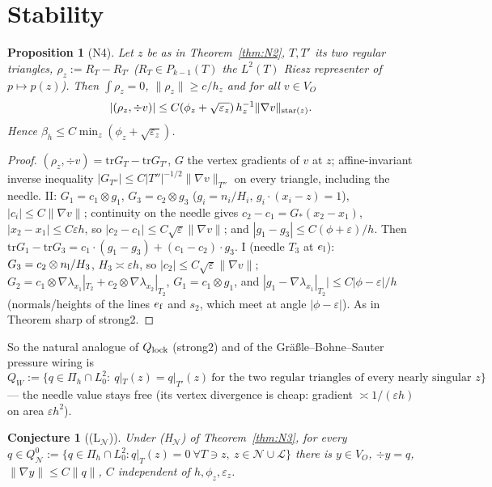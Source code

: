 \documentclass[11pt]{article}
\newtheorem{proposition}[theorem]{Proposition}
\newtheorem{conjecture}[theorem]{Conjecture}
\theoremstyle{remark}
\newcommand{\VO}{V_O}
\newcommand{\Pih}{\Pi_h}
\newcommand{\norm}[1]{\|#1\|}
\newcommand{\Nset}{\mathcal N}
\newcommand{\Lk}{\mathcal L}
\begin{document}
\section{Stability}\label{sec:stab}
\begin{proposition}[N4]\label{prop:beta}
Let $z$ be as in Theorem~\ref{thm:N2}, $T,T'$ its two regular triangles, $\rho_z:=R_T-R_{T'}$ ($R_T\in P_{k-1}(T)$ the $L^2(T)$ Riesz
representer of $p\mapsto p(z)$). Then $\int\rho_z=0$, $\norm{\rho_z}\ge c/h_z$ and for all $v\in\VO$
\[|(\rho_z,\div v)|\le C(\phi_z+\sqrt{\varepsilon_z})\,h_z^{-1}\norm{\nabla v}_{{\rm star}(z)} .\]
Hence $\beta_h\le C\min_z(\phi_z+\sqrt{\varepsilon_z})$.
\end{proposition}
\begin{proof}
$(\rho_z,\div v)=\mathrm{tr}G_T-\mathrm{tr}G_{T'}$, $G$ the vertex gradients of $v$ at $z$; affine-invariant inverse inequality
$|G_{T''}|\le C|T''|^{-1/2}\norm{\nabla v}_{T''}$ on every triangle, including the needle.
II: $G_1=c_1\otimes g_1$, $G_3=c_2\otimes g_3$ ($g_i=n_i/H_i$, $g_i\cdot(x_i-z)=1$), $|c_i|\le C\norm{\nabla v}$; continuity on the needle gives
$c_2-c_1=G_*(x_2-x_1)$, $|x_2-x_1|\le C\varepsilon h$, so $|c_2-c_1|\le C\sqrt\varepsilon\norm{\nabla v}$; and $|g_1-g_3|\le C(\phi+\varepsilon)/h$.
Then $\mathrm{tr}G_1-\mathrm{tr}G_3=c_1\cdot(g_1-g_3)+(c_1-c_2)\cdot g_3$.
I (needle $T_3$ at $e_{\rm l}$): $G_3=c_2\otimes n_{\rm l}/H_3$, $H_3\asymp\varepsilon h$, so $|c_2|\le C\sqrt\varepsilon\norm{\nabla v}$;
$G_2=c_1\otimes\nabla\lambda_{x_1}|_{T_2}+c_2\otimes\nabla\lambda_{x_2}|_{T_2}$, $G_1=c_1\otimes g_1$, and $|g_1-\nabla\lambda_{x_1}|_{T_2}|\le C|\phi-\varepsilon|/h$
(normals/heights of the lines $e_{\rm f}$ and $s_2$, which meet at angle $|\phi-\varepsilon|$). As in Theorem sharp of strong2.
\end{proof}
So the natural analogue of $Q_{\rm lock}$ (strong2) and of the Gr\"a\ss le--Bohne--Sauter pressure wiring is
\[
Q_W:=\{q\in\Pih\cap L^2_0:\ q|_T(z)=q|_{T'}(z)\ \text{for the two regular triangles of every nearly singular }z\}
\]
--- the needle value stays free (its vertex divergence is cheap: gradient $\asymp1/(\varepsilon h)$ on area $\varepsilon h^2$).

\begin{conjecture}[(L$_\Nset$)]
Under (H$_\Nset$) of Theorem~\ref{thm:N3}, for every $q\in Q_\Nset^0:=\{q\in\Pih\cap L^2_0: q|_T(z)=0\ \forall T\ni z,\ z\in\Nset\cup\Lk\}$
there is $y\in\VO$, $\div y=q$, $\norm{\nabla y}\le C\norm q$, $C$ independent of $h,\phi_z,\varepsilon_z$.
\end{conjecture}
\end{document}
